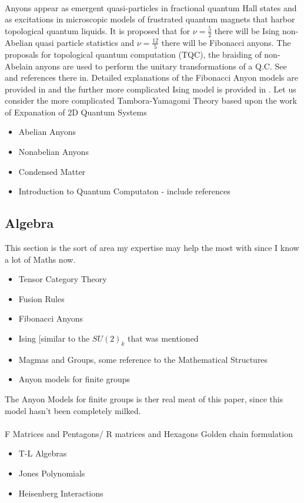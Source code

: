 \documentclass[preprint, 5p, authoryear, 12pt]{elsarticle}
\theoremstyle{plain}
\begin{document}
\paragraph{} Anyons appear as emergent quasi-particles in fractional quantum Hall states and as excitations in microscopic models of frustrated
quantum magnets that harbor topological quantum liquids. 
It is proposed that for $\nu=\frac{5}{2}$ there will be Ising non-Abelian quasi particle statistics and $\nu=\frac{12}{5}$ there will be 
Fibonacci anyons. The proposals for topological quantum computation (TQC), the braiding of non-Abelain anyons are used to perform the unitary
transformations of a Q.C. See \cite{TQC_Review_2008} and references there in. 
 Detailed explanations of the Fibonacci Anyon models are provided in \cite{2009arXiv0902.3275T} and the further more complicated Ising model
is provided in \cite{Bomin2010PhRvL.105c0403B_IsingAnyons}. 
Let us consider the more complicated Tambora-Yamagomi Theory based upon the work of \cite{etingof-2002}
Expanation of 2D Quantum Systems
\begin{itemize}
\item Abelian Anyons
\item Nonabelian Anyons
\item Condensed Matter
\item Introduction to Quantum Computaton - include references
\end{itemize}

\subsection{Algebra}
This section is the sort of area my expertise may help the most with 
since I know a lot of Maths now.
\begin{itemize}
\item Tensor Category Theory
\item Fusion Rules
\item Fibonacci Anyons
\item Ising [similar to the $SU(2)_{k}$ that was mentioned
\item Magmas and Groups, some reference to the Mathematical Structures
\item Anyon models for finite groups
\end{itemize}
The Anyon Models for finite groups is ther real meat of this paper, since this 
model hasn't been completely milked. 
   \paragraph{} F Matrices and Pentagons/ R matrices  and Hexagons
Golden chain formulation
\begin{itemize}
\item T-L Algebras 
\item Jones Polynomials
\item Heisenberg Interactions
\end{itemize} 
\end{document}
